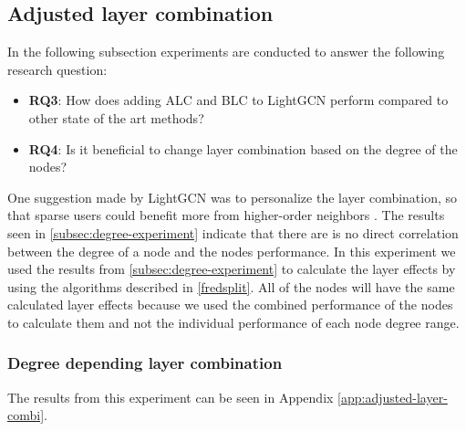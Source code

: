 \subsection{Adjusted layer combination}\label{subsec:adjusted-layer-combination}
In the following subsection experiments are conducted to answer the following research question:
\begin{itemize}
    \item \textbf{RQ3}: How does adding ALC and BLC to LightGCN perform compared to other state of the art methods?
    \item \textbf{RQ4}: Is it beneficial to change layer combination based on the degree of the nodes?
\end{itemize}
One suggestion made by LightGCN was to personalize the layer combination, so that sparse users could benefit more from higher-order neighbors \cite{lightgcn}.
The results seen in \autoref{subsec:degree-experiment} indicate that there are is no direct correlation between the degree of a node and the nodes performance.
In this experiment we used the results from \autoref{subsec:degree-experiment} to calculate the layer effects by using the algorithms described in \autoref{fredsplit}.
All of the nodes will have the same calculated layer effects because we used the combined performance of the nodes to calculate them and not the individual performance of each node degree range.

\subsubsection{Degree depending layer combination}
The results from this experiment can be seen in Appendix \ref{app:adjusted-layer-combi}.

